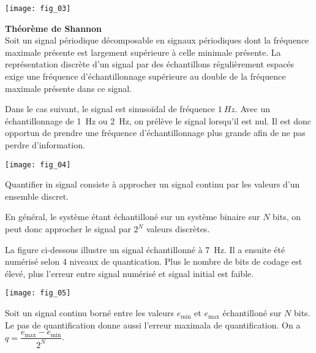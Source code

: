 \begin{center}
\texttt{[image: fig\_03]}
\end{center}

\begin{theorem}{\small{\textsf{\textbf{Théorème de Shannon}}}} ~\\
Soit un signal périodique décomposable en signaux périodiques dont la fréquence maximale présente est largement supérieure à celle minimale présente.
La représentation discrète d’un signal par des échantillons régulièrement espacés exige une fréquence d’échantillonnage supérieure au double de la fréquence maximale présente dans ce signal.
\end{theorem}

Dans le cas suivant, le signal est sinusoïdal de fréquence $\SI{1}{Hz}$. Avec un échantillonnage de \SI{1}{Hz} ou \SI{2}{Hz}, on prélève le signal lorsqu'il est nul. Il est donc opportun de prendre une fréquence d'échantillonnage plus grande afin de ne pas perdre d'information. 
\begin{center}
\texttt{[image: fig\_04]}
\end{center}




\begin{defi}[Quantification]
Quantifier in signal consiste à approcher un signal continu par les valeurs d'un ensemble discret. 

En général, le système étant échantilloné sur un système binaire sur $N$ bits, on peut donc approcher le signal par $2^N$ valeurs discrètes.
\end{defi}

La figure ci-dessous illustre un signal échantillonné à \SI{7}{Hz}. Il a ensuite été numérisé selon 4 niveaux de quantication. Plus le nombre de bits de codage est élevé, plus l'erreur entre signal numérisé et signal initial est faible.
 
\begin{center}
\texttt{[image: fig\_05]}
\end{center}


\begin{defi}
Soit un signal continu borné entre les valeurs $e_{\text{min}}$ et $e_{\text{max}}$ échantilloné sur $N$ bits. Le pas de quantification donne aussi l'erreur maximala de quantification. On a $q = \dfrac{e_{\text{max}}-e_{\text{min}}}{2^N}$.

\end{defi}


